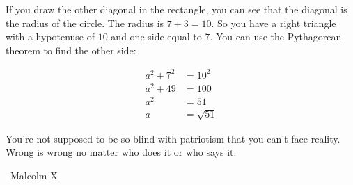 \documentclass[fleqn,addpoints]{exam}
\begin{document}
\ifprintanswers

If you draw the other diagonal in the rectangle, you can see that the diagonal is the radius of the circle.  The radius
is $7+3=10$.  So you have a right triangle with a hypotenuse of $10$ and one side equal to $7$.  You can use the
Pythagorean theorem to find the other side:

\begin{align*}
  a^2 + 7^2 &= 10^2 \\
  a^2 + 49 &= 100 \\
  a^2 &= 51 \\
  a &= \sqrt{51}    
\end{align*}

\else
\vspace{1.5 in}

\begin{em}
You're not supposed to be so blind with patriotism that you can't face reality. Wrong is wrong no matter who does it or who says it. 
\end{em}

\vspace{0.1 in}
\hspace{0.5 in} --Malcolm X

\fi
\end{document}
